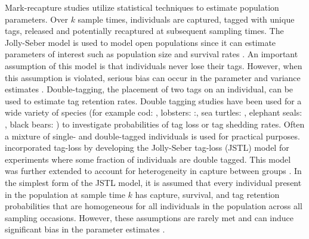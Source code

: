 \documentclass[12pt]{article}
\begin{document}
Mark-recapture studies utilize statistical techniques to estimate
population parameters. Over \(k\) sample times, individuals are captured, tagged with unique tags, released and potentially
recaptured at subsequent sampling times. The Jolly-Seber model \citep{Jolly:1965, Seber:1965}
 is used to model open populations since it
can estimate parameters of interest such as population size and survival
rates \citep{Pollock:1990}. An important assumption of this model is that 
individuals never lose their tags. However, when this assumption is
violated, serious bias can occur in the parameter and variance estimates
\citep{Arnason:1981}. Double-tagging, the placement of two tags on
an individual, can be used to estimate tag retention rates. Double tagging studies have been used for a wide variety of species (for example cod: \citealt{Bjornsson:2011}, lobsters: \citealt{Xu:2014}:, sea turtles: \citealt{Bjorndal:1996}, elephant seals: \citealt{Pistorius:2000}, black bears: \citealt{Diefenbach:1998})   to investigate probabilities of tag loss or tag shedding rates.  Often a
mixture of single- and double-tagged individuals is used for practical
purposes. \cite{Cowen:2006} incorporated tag-loss by developing
the Jolly-Seber tag-loss (JSTL) model for experiments where some
fraction of individuals are double tagged. This model was further
extended to account for heterogeneity in capture between groups \citep{Xu:2014}. In the simplest form of the JSTL model, it is assumed that
every individual present in the population at sample time \(k\)
has capture, survival, and tag retention
probabilities that are homogeneous for all individuals in the population
across all sampling occasions.  However, these assumptions are rarely met and can induce significant bias in the parameter estimates \citep{Schwarz:2012}.
\end{document}

